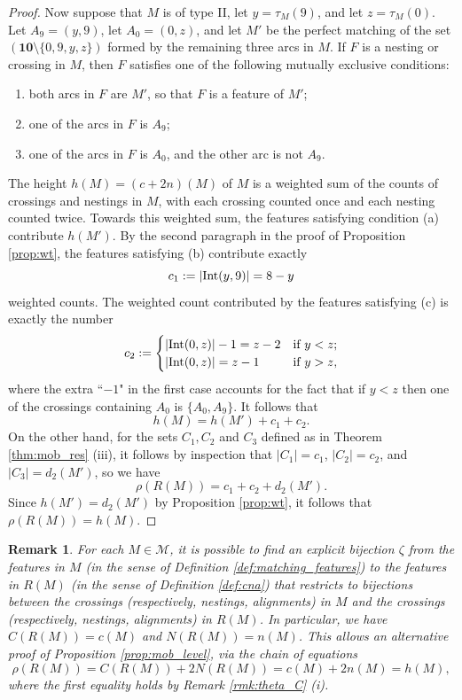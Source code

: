 \documentclass[10pt,a4paper]{amsart}
\newtheorem{rmk}[theorem]{Remark}
\numberwithin{equation}{section}
\newcommand{\calm}{\mathcal{M}}
\newcommand{\ten}{\mathbf{10}}
\DeclareMathOperator{\interior}{\rm{Int}}
\newcommand{\abs}[1]{\lvert #1 \rvert}
\begin{document}
\begin{proof}
Now suppose that $M$ is of type II, let $y=\tau_M(9)$, and let $z=\tau_M(0)$.
Let $A_9=(y,9)$,
let $A_0=(0,z)$, and let $M'$ be the perfect matching of
the set $(\ten\setminus\{0,9,y,z\})$ formed by the remaining three arcs in $M$. 
If $F$ is a nesting or crossing in $M$, then $F$ satisfies one of
the following mutually exclusive conditions: 
\begin{enumerate}
  \item[(a)] both arcs in $F$ are $M'$, so that $F$ is a feature of $M'$;
  \item[(b)] one of the arcs in $F$ is $A_9$;
  \item[(c)] one of the arcs in $F$ is $A_0$, and the other arc is
    not $A_9$. 
\end{enumerate}
The height $h(M)=(c+2n)(M)$ of $M$ is a weighted sum of the counts of crossings and
nestings in $M$, with each crossing counted once and each nesting counted twice.
Towards this weighted sum, the features satisfying condition (a) contribute
$h(M')$. By the second paragraph in the proof of Proposition \ref{prop:wt}, the features satisfying (b)
contribute exactly 
\[
c_1:=\abs{\interior(y,9)}=8-y
\] weighted counts. The weighted
count contributed by the features satisfying (c) is exactly 
the number
\[
c_2 :=  
\begin{cases}
  \abs{\interior(0,z)}-1= z-2 & \text{if $y<z$};\\
  \abs{\interior(0,z)} = z-1 & \text{if $y>z$},
\end{cases}
\]
where the extra ``$-1$" in the first case accounts for the fact that if $y<z$
then one of the crossings containing $A_0$ is $\{A_0,A_9\}$. It follows that 
\[
h(M)=h(M')+c_1+c_2.
\]
On the other hand, for the sets $C_1, C_2$ and $C_3$ defined as in Theorem
\ref{thm:mob_res} (iii), it follows by inspection that
$\abs{C_1}=c_1$, $\abs{C_2}=c_2$, and $\abs{C_3}=d_2(M')$, so we have 
\[
\rho(R(M))= c_1+c_2+d_2(M').
\]
Since $h(M')=d_2(M')$ by Proposition \ref{prop:wt},  it follows that
$\rho(R(M))=h(M)$.
\end{proof}

\begin{rmk}
\label{rmk:features}
For each $M\in \calm$, it is possible to find an explicit bijection $\zeta$ from
the features in $M$ (in the sense of Definition \ref{def:matching_features}) to
the features in $R(M)$ (in the sense of Definition \ref{def:cna}) that restricts
to bijections between the crossings (respectively, nestings, alignments) in $M$
and the crossings (respectively, nestings, alignments) in $R(M)$. In particular,
we have $C(R(M))=c(M)$ and $N(R(M))=n(M)$. This allows an
alternative proof of Proposition \ref{prop:mob_level}, via the chain of
equations
\[
\rho(R(M))=C(R(M))+2N(R(M))=c(M)+2n(M)=h(M),
\]
where the first equality holds by Remark \ref{rmk:theta_C} (i).
\end{rmk}
\end{document}
